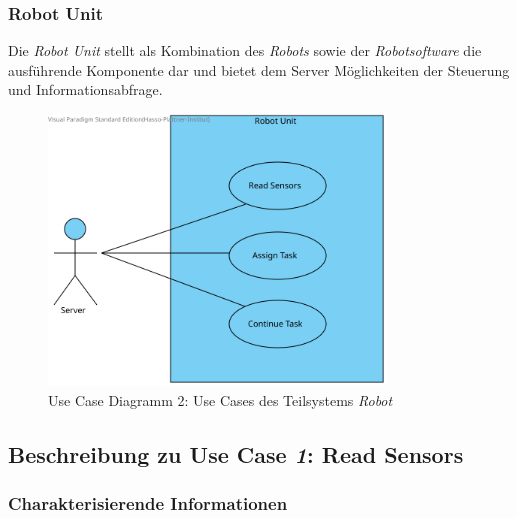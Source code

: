 			\subsubsection{Robot Unit}
			Die \emph{Robot Unit} stellt als Kombination des \emph{Robots} sowie der \emph{Robotsoftware} die ausführende Komponente dar und bietet dem Server Möglichkeiten der Steuerung und Informationsabfrage.
				\begin{figure}[H]
					\centering
					\includegraphics[width=0.8\textwidth]{img/2-Analyse-RobotUnit}
					\caption{Use Case Diagramm 2: Use Cases des Teilsystems \emph{Robot}}
					\label{fig:3-1-use-cases-robot-unit}
				\end{figure}

		\pagebreak


		\subsection{Beschreibung zu Use Case \emph{1}: Read Sensors}

			\subsubsection*{Charakterisierende Informationen}

